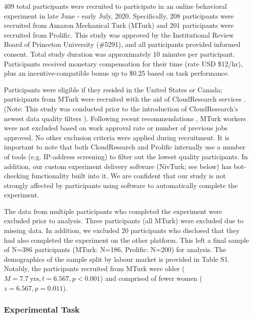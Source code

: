 \documentclass[a4paper,notitlepage,12pt]{article}
\begin{document}
\begin{refsection}[main]
409 total participants were recruited to participate in an online behavioral experiment in late June - early July, 2020. Specifically, 208 participants were recruited from Amazon Mechanical Turk (MTurk) and 201 participants were recruited from Prolific. This study was approved by the Institutional Review Board of Princeton University (\#5291), and all participants provided informed consent. Total study duration was approximately 10 minutes per participant. Participants received monetary compensation for their time (rate USD \$12/hr), plus an incentive-compatible bonus up to \$0.25 based on task performance. 

Participants were eligible if they resided in the United States or Canada; participants from MTurk were recruited with the aid of CloudResearch services \cite{litman2017turkprime}. (Note: This study was conducted prior to the introduction of CloudResearch's newest data quality filters \cite{cloudresearch_2020}). Following recent recommendations \cite{robinson2019tapped}, MTurk workers were not excluded based on work approval rate or number of previous jobs approved. No other exclusion criteria were applied during recruitment. It is important to note that both CloudResearch and Prolific internally use a number of tools (e.g. IP-address screening) to filter out the lowest quality participants. In addition, our custom experiment delivery software (NivTurk; see below) has bot-checking functionality built into it. We are confident that our study is not strongly affected by participants using software to automatically complete the experiment.

The data from multiple participants who completed the experiment were excluded prior to analysis. Three participants (all MTurk) were excluded due to missing data. In addition, we excluded 20 participants who disclosed that they had also completed the experiment on the other platform. This left a final sample of N=386 participants (MTurk: N=186, Prolific: N=200) for analysis. The demographics of the sample split by labour market is provided in Table S1. Notably, the participants recruited from MTurk were older ($M = 7.7 \ \text{yrs}, t = 6.567, p < 0.001$) and comprised of fewer women ($z = 6.567, p = 0.011$). 

\subsubsection{Experimental Task}


\end{refsection}
\end{document}

